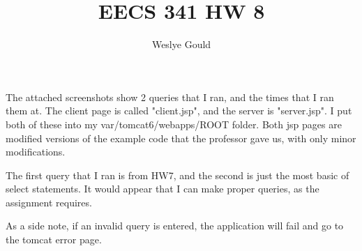 \documentclass{article}
\author{Weslye Gould}
\title{EECS 341 HW 8}
\begin{document}
\maketitle

The attached screenshots show 2 queries that I ran, and the times that I ran them at.
The client page is called "client.jsp", and the server is "server.jsp".  
I put both of these into my var/tomcat6/webapps/ROOT folder.
Both jsp pages are modified versions of the example code that the professor gave us, with only minor modifications.

The first query that I ran is from HW7, and the second is just the most basic of select statements.
It would appear that I can make proper queries, as the assignment requires.

As a side note, if an invalid query is entered, the application will fail and go to the tomcat error page.
\end{document}
